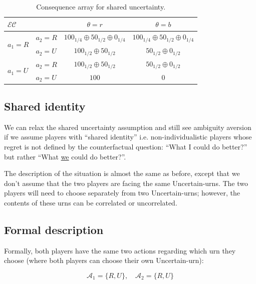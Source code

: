 \documentclass{article}
\theoremstyle{definition}
\begin{document}
\begin{table}[H]
\begin{center}
\begin{tabular}{|l l|c c|}
\hline
\multirow{1}{*}{$\mathcal{EC}$} & & $\theta=r$  & $\theta=b$\\
\hline
\multirow{2}{*}{$a_1=R$}
  & $a_2=R$ &
  $100_{1/4} \oplus 50_{1/2} \oplus 0_{1/4}$ &
  $100_{1/4} \oplus 50_{1/2} \oplus 0_{1/4}$\\
\cline{2-4}
  & $a_2=U$ &
  $100_{1/2} \oplus 50_{1/2}$ &
  $50_{1/2} \oplus 0_{1/2}$\\
\hline
\multirow{2}{*}{$a_1=U$}
  & $a_2=R$ &
  $100_{1/2} \oplus 50_{1/2}$ &
  $50_{1/2} \oplus 0_{1/2}$\\
\cline{2-4}
  & $a_2=U$ &
  $100$ &  $0$\\
\hline
\end{tabular}
    \caption{Consequence array for shared uncertainty.}
        \label{tab:ConsequenceSharedUncertainty}
\end{center}
\end{table}

\subsection{Shared identity}

We can relax the shared uncertainty assumption and still see ambiguity aversion if we assume players with ``shared identity'' i.e. non-individualistic players whose regret is not defined by the counterfactual question: ``What I could do better?'' but rather ``What \underline{we} could do better?''.

The description of the situation is almost the same as before, except that we don't assume that the two players are facing the same Uncertain-urns. The two players will need to choose separately from two Uncertain-urns; however, the contents of these urns can be correlated or uncorrelated.

\subsection{Formal description}

Formally, both players have the same two actions regarding which urn they choose (where both players can choose their own Uncertain-urn):

\begin{equation}
    \mathcal{A}_1 = \{ R, U \}, \quad
    \mathcal{A}_2 = \{ R, U \}
\end{equation}
\end{document}
